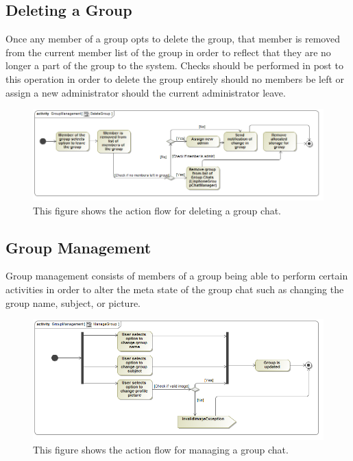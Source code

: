 \documentclass[11pt]{article}
\begin{document}
\subsection{Deleting a Group}
Once any member of a group opts to delete the group, that member is removed from the current member list of the group in order to reflect that they are no longer a part of the group to the system. Checks should be performed in post to this operation in order to delete the group entirely should no members be left or assign a new administrator should the current administrator leave.
\begin{figure}[H]
\centering
\includegraphics[width=5in]{./images/activity_delete_group.png}
\caption[Delete Group Activity Diagram]{This figure shows the action flow for deleting a group chat.}
\label{ad-delete-group}
\end{figure}
\subsection{Group Management}
Group management consists of members of a group being able to perform certain activities in order to alter the meta state of the group chat such as changing the group name, subject, or picture.
\begin{figure}[H]
\centering
\includegraphics[width=5in]{./images/activity_manage_group.png}
\caption[Manage Group Activity Diagram]{This figure shows the action flow for managing a group chat.}
\label{ad-manage-group}
\end{figure}
\end{document}
